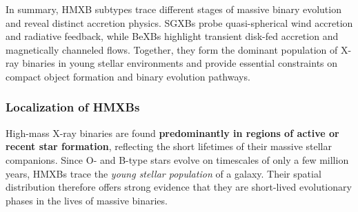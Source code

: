 \par
In summary, HMXB subtypes trace different stages of massive binary evolution and reveal distinct accretion physics. SGXBs probe quasi-spherical wind accretion and radiative feedback, while BeXBs highlight transient disk-fed accretion and magnetically channeled flows. Together, they form the dominant population of X-ray binaries in young stellar environments and provide essential constraints on compact object formation and binary evolution pathways.

\subsubsection{Localization of HMXBs}

High-mass X-ray binaries are found \textbf{predominantly in regions of active or recent star formation}, reflecting the short lifetimes of their massive stellar companions. Since O- and B-type stars evolve on timescales of only a few million years, HMXBs trace the \emph{young stellar population} of a galaxy. Their spatial distribution therefore offers strong evidence that they are short-lived evolutionary phases in the lives of massive binaries.

